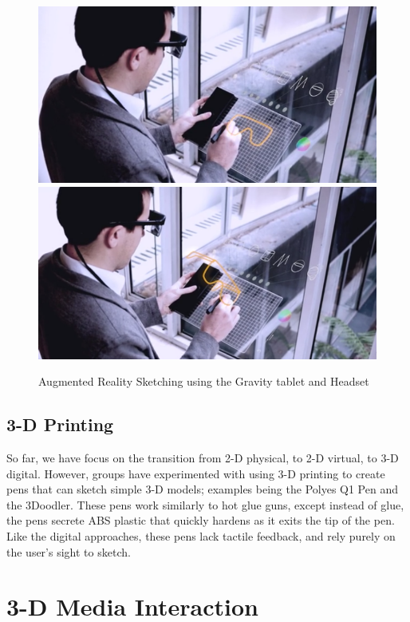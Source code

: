 \documentclass[12pt]{report}
\begin{document}
\begin{figure}
\includegraphics[width=\textwidth]{gravity1.png}
\includegraphics[width=\textwidth]{gravity2.png}
\caption{Augmented Reality Sketching using the Gravity tablet and Headset}
\end{figure}

\subsection{3-D Printing}

So far, we have focus on the transition from 2-D physical, to 2-D virtual, to 3-D digital. 
However, groups have experimented with using 3-D printing to create pens that can sketch simple 3-D models; examples being the Polyes Q1 Pen and the 3Doodler.
These pens work similarly to hot glue guns, except instead of glue, the pens secrete ABS plastic that quickly hardens as it exits the tip of the pen.
Like the digital approaches, these pens lack tactile feedback, and rely purely on the user's sight to sketch.

\pagebreak

\section{3-D Media Interaction}
\end{document}
